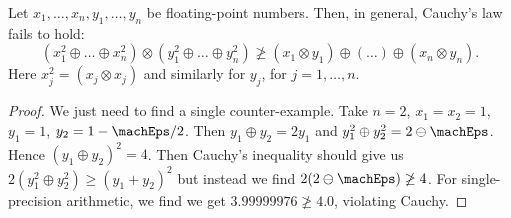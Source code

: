 \begin{prop}
Let $x_{1},\dots,x_{n},y_{1},\dots,y_{n}$ be floating-point
numbers. Then, in general, Cauchy's law fails to hold:
\begin{equation}
  (x_{1}^{2}\oplus\dots\oplus x_{n}^{2})\otimes(y_{1}^{2}\oplus\dots\oplus y_{n}^{2})\not\geq
  (x_{1}\otimes y_{1})\oplus(\dots)\oplus(x_{n}\otimes y_{n}).
\end{equation}
Here $x_{j}^{2}=(x_{j}\otimes x_{j})$ and similarly for $y_{j}$, for $j=1,\dots,n$.
\end{prop}
\begin{proof}
  We just need to find a single counter-example.
  Take $n=2$, $x_{1}=x_{2}=1$, $y_{1}=1$, $y_{2} = 1 - \machEps/2$. Then
  $y_{1}\oplus y_{2}=2y_{1}$
  and $y_{1}^{2}\oplus y_{2}^{2} = 2\ominus\machEps$.
  Hence $(y_{1} \oplus y_{2})^{2} = 4$. Then Cauchy's inequality should
  give us $2(y_{1}^{2}\oplus y_{2}^{2})\geq(y_{1} + y_{2})^{2}$ but
  instead we find $2(2\ominus\machEps)\not\geq 4$. For single-precision
  arithmetic, we find we get $3.99999976\not\geq 4.0$, violating Cauchy.
\end{proof}



